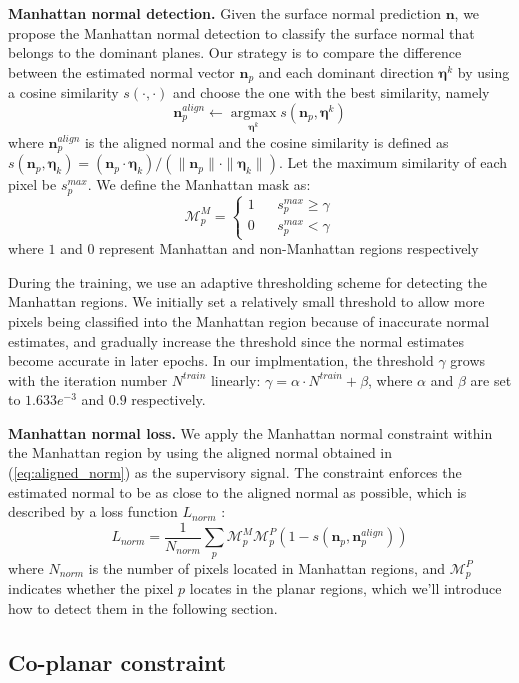 \documentclass[10pt,twocolumn,letterpaper]{article}
\newcommand{\bv}[1]{{\bm {#1}}}
\newcommand{\beq}{\begin{equation}}
\newcommand{\eeq}{\end{equation}}
\newcommand{\Eq}[1]{(\ref{#1})}
\begin{document}
\textbf{Manhattan normal detection.}
Given the surface normal prediction ${\bv{n}}$, we propose the Manhattan normal detection to classify the surface normal that belongs to the dominant planes. Our strategy is to compare the difference between the estimated normal vector ${\bv{n}}_{p}$  and each dominant direction $\bv{\eta}^k$ by using a cosine similarity  $s(\cdot ,\cdot)$ and choose the one with the best similarity, namely
\beq
\bv{n}^{align}_{p} \leftarrow{ 
	\mathop{\arg\max}\limits_{\bv{\eta}^k}
	s({\bv{n}}_{p}, \bv{\eta}^k)
}
\label{eq:aligned_norm}
\eeq
where $\bv{n}^{align}_{p}$ is the aligned normal and the cosine similarity is defined as
$
s({\bv{n}}_{p}, \bv{\eta}_k) = ({\bv{n}}_{p} \cdot \bv{\eta}_k) / 
(\| {\bv{n}}_{p}\| \cdot \|\bv{\eta}_k \|).
$
Let the maximum similarity of each pixel be $s^{max}_{p}$. We define the Manhattan mask as:
\beq
\mathcal{M}^M_{p}=\left\{
\begin{array}{rcl}
	1   &      & {s^{max}_{p} \geq \gamma}\\
	0   &      & {s^{max}_{p} < \gamma}
\end{array} \right.
\eeq where $1$ and $0$ represent Manhattan and non-Manhattan regions respectively

During the training, we use an adaptive thresholding scheme for detecting the Manhattan regions. We initially set a relatively small threshold to allow 
more pixels being classified into the Manhattan region because of inaccurate normal estimates, and gradually increase the threshold since the normal estimates become accurate in later epochs.
In our implmentation, the threshold $\gamma$ grows with the iteration number $N^{train}$ linearly: $\gamma = \alpha \cdot N^{train} + \beta$, where $\alpha$ and $\beta$ are set to $1.633 e^{-3}$ and $0.9$ respectively.

{ \bf Manhattan normal loss.  }
We apply the Manhattan normal constraint 
within the Manhattan region by using the aligned normal obtained in \Eq{eq:aligned_norm} as the supervisory signal. 
The constraint enforces the estimated normal to be as close to the aligned normal as possible, which is described by a  loss function $L_{norm}$ :
\beq
L_{norm} = \frac{1}{N_{norm}} \sum_{p} \mathcal{M}^M_{p} \mathcal{M}^P_p(1-s({\bv{n}}_{p},\bv{n}^{align}_{p}))	\eeq where $N_{norm}$ is the number of pixels located in Manhattan regions, and $\mathcal{M}^{P}_p$ indicates whether the pixel $p$ locates in the planar regions, which we'll introduce how to detect them in the following section.

\subsection{Co-planar constraint}
\end{document}
